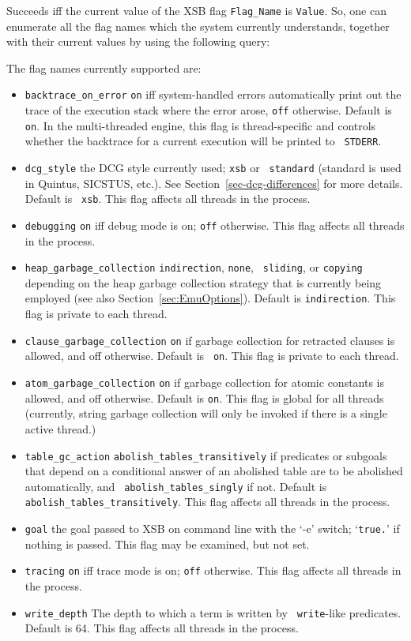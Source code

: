 \begin{description}
    Succeeds iff the current value of the XSB flag {\tt Flag\_Name} is 
    {\tt Value}. So, one can enumerate all the flag names which the system
    currently understands, together with their current values by using the
    following query:


    The flag names currently supported are:
\begin{itemize}
%
\item {\tt backtrace\_on\_error} {\tt on} iff system-handled errors
automatically print out the trace of the execution stack where the
error arose, {\tt off} otherwise. Default is {\tt on}.  In the
multi-threaded engine, this flag is thread-specific and controls
whether the backtrace for a current execution will be printed to {\tt
  STDERR}.
%
\item {\tt dcg\_style}  the DCG style currently used; {\tt xsb} or {\tt
  standard} (standard is used in Quintus, SICSTUS, etc.).  See
Section~\ref{sec-dcg-differences} for more details. Default is {\tt
  xsb}. This flag affects all threads in the process.
%
\item {\tt debugging}  {\tt on} iff debug mode is on; {\tt off} otherwise.
This flag affects all threads in the process. 
%
\item {\tt heap\_garbage\_collection}  {\tt indirection}, {\tt none}, {\tt
  sliding}, or {\tt copying} depending on the heap garbage collection
strategy that is currently being employed (see also
Section~\ref{sec:EmuOptions}).  Default is {\tt indirection}.  This
flag is private to each thread.  
%
\item {\tt clause\_garbage\_collection}  {\tt on} if garbage collection for
retracted clauses is allowed, and off otherwise. Default is {\tt
  on}.  This flag is private to each thread.  
%
\item {\tt atom\_garbage\_collection}  {\tt on} if garbage collection for
atomic constants is allowed, and off otherwise. Default is {\tt on}.
This flag is global for all threads (currently, string garbage
collection will only be invoked if there is a single active thread.)

%
\item {\tt table\_gc\_action}  {\tt abolish\_tables\_transitively} if
  predicates or subgoals that depend on a conditional answer of an
  abolished table are to be abolished automatically, and {\tt
    abolish\_tables\_singly} if not.  Default is {\tt
    abolish\_tables\_transitively}.  This flag affects all threads in
  the process. 
%
\item {\tt goal}  the goal passed to XSB on command line with the `-e'
switch; `{\tt true.}' if nothing is passed.  This flag may be
examined, but not set. 
%
\item {\tt tracing}  {\tt on} iff trace mode is on; {\tt off}
otherwise. This flag affects all threads in the process. 
%
\item {\tt write\_depth}  The depth to which a term is written by {\tt
  write}-like predicates.  Default is 64.  This flag affects all
threads in the process.  


\end{itemize}
\end{description}
